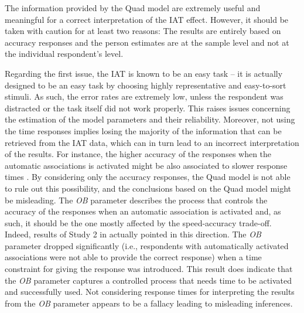 \documentclass[12pt]{book}
\begin{document}
The information provided by the Quad model are extremely useful and meaningful for a correct interpretation of the IAT effect. 
However, it should be taken with caution for at least two reasons: The results are entirely based on accuracy responses and the person estimates are at the sample level and not at the individual respondent's level.

Regarding the first issue, the IAT is known to be an easy task -- it is actually designed to be an easy task by choosing highly representative and easy-to-sort stimuli. As such, the error rates are extremely low, unless the respondent was distracted or the task itself did not work properly. This raises issues concerning the estimation of the model parameters and their reliability. Moreover, not using the time responses implies losing the majority of the information that can be retrieved from the IAT data, which can in turn lead to an incorrect interpretation of the results. 
For instance, the higher accuracy of the responses when the automatic associations is activated might be also associated to slower response times \cite<speed-accuracy trade-off,>{Klauer2007}. By considering only the accuracy responses, the Quad model is not able to rule out this possibility, and the conclusions based on the Quad model might be misleading.
The \emph{OB} parameter describes the process that controls the accuracy of the responses when an automatic association is activated and, as such, it should be the one mostly affected by the speed-accuracy trade-off. Indeed, results of Study 2 in  actually pointed in this direction. The \emph{OB} parameter dropped significantly (i.e., respondents with automatically activated associations were not able to provide the correct response) when a time constraint for giving the response was introduced.
This result does indicate that the \emph{OB} parameter captures a controlled process that needs time to be activated and successfully used. 
Not considering response times for interpreting the results from the \emph{OB} parameter appears to be a fallacy leading to misleading inferences.
\end{document}
